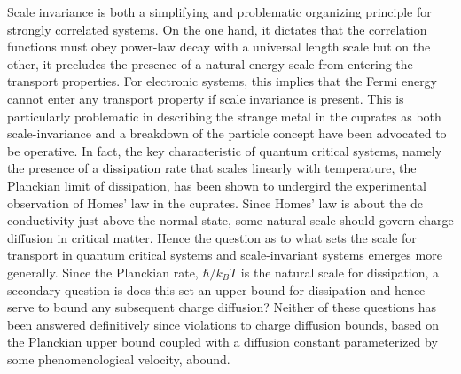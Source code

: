 \documentclass[prl,aps,twocolumn,groupaddress]{revtex4-1}
\begin{document}
Scale invariance is both a simplifying and problematic organizing principle for strongly correlated systems.  On the one hand, it dictates that the correlation functions must obey power-law decay with a universal length scale  but on the other, it precludes the presence of a natural energy scale from entering the transport properties.  For electronic systems, this implies that the Fermi energy cannot enter any transport property if scale invariance is present.  This is particularly problematic in describing the strange metal in the cuprates as both scale-invariance and a breakdown of the particle concept have been advocated\cite{homes2004,qcrit2,Marel2003,Valla2110,Anderson1997,abrahams,pll2015} to be operative.  In fact, the key characteristic of quantum critical systems, namely the presence of a dissipation rate that scales linearly with temperature, the Planckian limit of dissipation, has been shown\cite{zaanen} to undergird the experimental observation of Homes' law\cite{homes2004} in the cuprates.  Since Homes' law is about the dc conductivity just above the normal state, some natural scale should govern charge diffusion in critical matter. Hence the question as to what sets the scale for transport in quantum critical systems and scale-invariant systems emerges more generally.   Since the Planckian\cite{zaanen} rate, $\hbar/k_BT$ is the natural scale for dissipation, a secondary question is does this set an upper bound for dissipation and hence serve to bound any subsequent charge diffusion?   Neither of these questions has been answered definitively since violations\cite{pakhira2014,kuang2015,kovtun2008,kovtun2003,myers2007,pang2009} to charge diffusion bounds\cite{hartnoll,blake}, based on the Planckian upper bound coupled with a diffusion constant parameterized by some phenomenological velocity, abound. 
\end{document}
